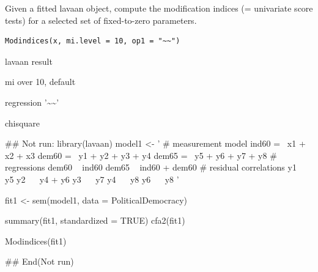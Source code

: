 \documentclass[a4paper]{book}
\begin{document}
%
\begin{Description}
Given a fitted lavaan object, compute the modification indices (= univariate score tests) for a selected set of fixed-to-zero parameters.
\end{Description}
%
\begin{Usage}
\begin{verbatim}
Modindices(x, mi.level = 10, op1 = "~~")
\end{verbatim}
\end{Usage}
%
\begin{Arguments}
\begin{ldescription}
\item[\code{x}] lavaan result

\item[\code{mi.level}] mi over 10, default

\item[\code{op1}] regression '\textasciitilde{}\textasciitilde{}'
\end{ldescription}
\end{Arguments}
%
\begin{Value}
chisquare
\end{Value}
%
\begin{Examples}
\begin{ExampleCode}
\#\# Not run: 
library(lavaan)
model1 <- '
  # measurement model
    ind60 =~ x1 + x2 + x3
    dem60 =~ y1 + y2 + y3 + y4
    dem65 =~ y5 + y6 + y7 + y8
  # regressions
    dem60 ~ ind60
    dem65 ~ ind60 + dem60
 # residual correlations
    y1 ~~ y5
    y2 ~~ y4 + y6
    y3 ~~ y7
    y4 ~~ y8
    y6 ~~ y8
'

fit1 <- sem(model1, data = PoliticalDemocracy)

 summary(fit1, standardized = TRUE)
cfa2(fit1)

Modindices(fit1)

## End(Not run)



\end{ExampleCode}
\end{Examples}
\end{document}
